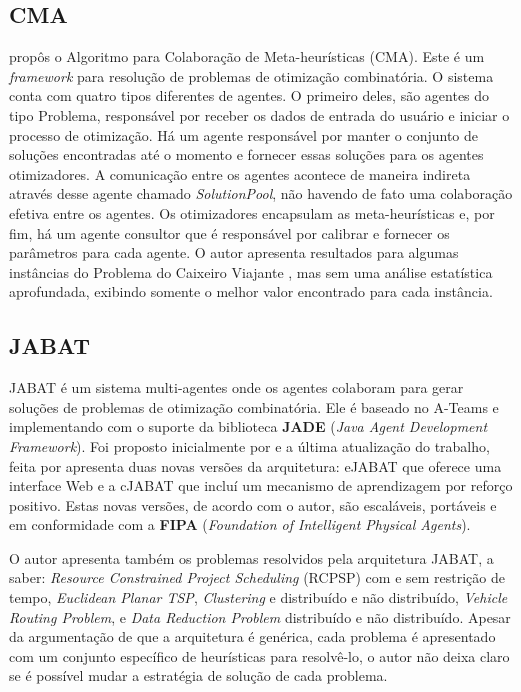 \subsection{CMA}
 propôs o Algoritmo para Colaboração de Meta-heurísticas (CMA). Este é um \textit{framework} para resolução de problemas de otimização combinatória. O sistema conta com quatro tipos diferentes de agentes. O primeiro deles, são agentes do tipo Problema, responsável por receber os dados de entrada do usuário e iniciar o processo de otimização. Há um agente responsável por manter o conjunto de soluções encontradas até o momento e fornecer essas soluções para os agentes otimizadores. A comunicação entre os agentes acontece de maneira indireta através desse agente chamado \textit{SolutionPool}, não havendo de fato uma colaboração efetiva entre os agentes. Os otimizadores encapsulam as meta-heurísticas e, por fim, há um agente consultor que é responsável por calibrar e fornecer os parâmetros para cada agente. O autor apresenta resultados para algumas instâncias do Problema do Caixeiro Viajante \cite{malek2010}, mas sem uma análise estatística aprofundada, exibindo somente o melhor valor encontrado para cada instância. 

\subsection{JABAT}
JABAT é um sistema multi-agentes onde os agentes colaboram para gerar soluções de problemas de otimização combinatória. Ele é baseado no A-Teams e implementando com o suporte da biblioteca \textbf{JADE} (\textit{Java Agent Development Framework}). Foi proposto inicialmente por  e a última atualização do trabalho, feita por  apresenta duas novas versões da arquitetura: eJABAT que oferece uma interface Web e a cJABAT que incluí um mecanismo de aprendizagem por reforço positivo. Estas novas versões, de acordo com o autor, são escaláveis, portáveis e em conformidade com a \textbf{FIPA} (\textit{Foundation of Intelligent Physical Agents}). 

O autor apresenta também os problemas resolvidos pela arquitetura JABAT, a saber: \textit{Resource Constrained Project Scheduling} (RCPSP) com e sem restrição de tempo, \textit{Euclidean Planar TSP}, \textit{Clustering} e distribuído e não distribuído, \textit{Vehicle Routing Problem}, e \textit{Data Reduction Problem} distribuído e não distribuído. Apesar da argumentação de que a arquitetura é genérica, cada problema é apresentado com um conjunto específico de heurísticas para resolvê-lo, o autor não deixa claro se é possível mudar a estratégia de solução de cada problema. 

